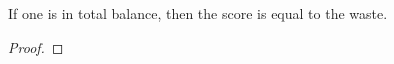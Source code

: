 \begin{lemma}
\label{score-eq}
\leanok
If one is in total balance, then the score is equal to the waste.
\end{lemma}
\begin{proof}
\leanok
\end{proof}
